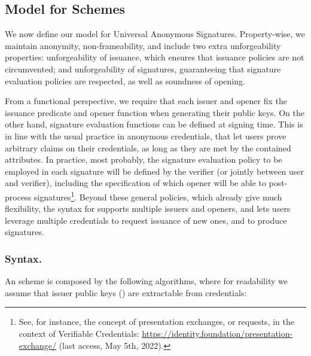 \subsection{Model for \UAS Schemes}
\label{ssec:model-uas}

We now define our model for Universal Anonymous Signatures. Property-wise, we
maintain anonymity, non-frameability, and include two extra unforgeability
properties: unforgeability of issuance, which ensures that issuance policies
are not circumvented; and unforgeability of signatures, guaranteeing that
signature evaluation policies are respected, as well as soundness of opening.

From a functional perspective, we require that each issuer and opener fix
the issuance predicate \fissue and opener function \finsp when generating
their public keys. On the other hand, signature evaluation functions \feval can
be defined at signing time. This is in line with the usual practice in anonymous
credentials, that let
users prove arbitrary claims on their credentials, as long as they are met by
the contained attributes. In practice, most probably, the signature evaluation
policy to be
employed in each signature will be defined by the verifier (or jointly between
user and verifier), including the specification of which opener will be
able to post-process signatures\footnote{See, for instance, the concept of
  presentation exchanges, or requests, in the context of Verifiable Credentials:
  \url{https://identity.foundation/presentation-exchange/} (last access, May
  5th, 2022).}. Beyond these general policies, which already give much
flexibility, the syntax for \UAS supports multiple issuers and openers, and
lets users leverage multiple credentials to request issuance of new ones, and
to produce signatures.

\subsubsection{Syntax.} An \UAS scheme is composed by the following algorithms,
where for readability we assume that issuer public keys (\ipk) are extractable
from credentials:


